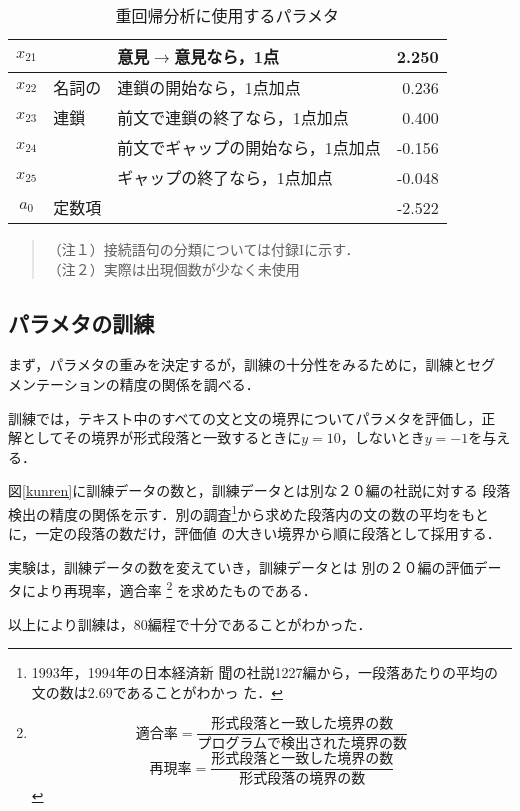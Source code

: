 \begin{table}[htb]
\begin{center}
\begin{tabular}{|c|l|l||r|}
     $x_{21}$ & 	& 意見$\rightarrow$意見なら，1点 & 2.250 \\ \hline
     $x_{22}$ & 名詞の	& 連鎖の開始なら，1点加点 & 0.236 \\
     $x_{23}$ & 連鎖	& 前文で連鎖の終了なら，1点加点 & 0.400 \\
     $x_{24}$ & 	& 前文でギャップの開始なら，1点加点 & -0.156 \\
     $x_{25}$ & 	& ギャップの終了なら，1点加点 & -0.048 \\ \hline \hline
	$a_0$ & 定数項  & & -2.522 \\ \hline
    \end{tabular}
  \end{center}
\begin{quote}
\hspace*{1mm}（注１）接続語句の分類については付録Iに示す．\\
\hspace*{1mm}（注２）実際は出現個数が少なく未使用\\
\end{quote}
  \caption {重回帰分析に使用するパラメタ}
  \label{juu-param}
\end{table}


\subsection{パラメタの訓練}

まず，パラメタの重みを決定するが，訓練の十分性をみるために，訓練とセグ
メンテーションの精度の関係を調べる．

訓練では，テキスト中のすべての文と文の境界についてパラメタを評価し，正
解としてその境界が形式段落と一致するときに$y=10$，しないとき$y=-1$を与え
る．

図\ref{kunren}に訓練データの数と，訓練データとは別な２０編の社説に対する
段落検出の精度の関係を示す．別の調査\footnote{1993年，1994年の日本経済新
聞の社説1227編から，一段落あたりの平均の文の数は$2.69$であることがわかっ
た．}から求めた段落内の文の数の平均をもとに，一定の段落の数だけ，評価値
の大きい境界から順に段落として採用する．

実験は，訓練データの数を変えていき，訓練データとは
別の２０編の評価データにより再現率，適合率
\footnote{
\[
\mbox{適合率} = \frac{\mbox{形式段落と一致した境界の数}}{\mbox{プログラムで検出された境界の数}}
\]
\[
\mbox{再現率} = \frac{\mbox{形式段落と一致した境界の数}}{\mbox{形式段落の境界の数}}
\]}
を求めたものである．

以上により訓練は，80編程で十分であることがわかった．

